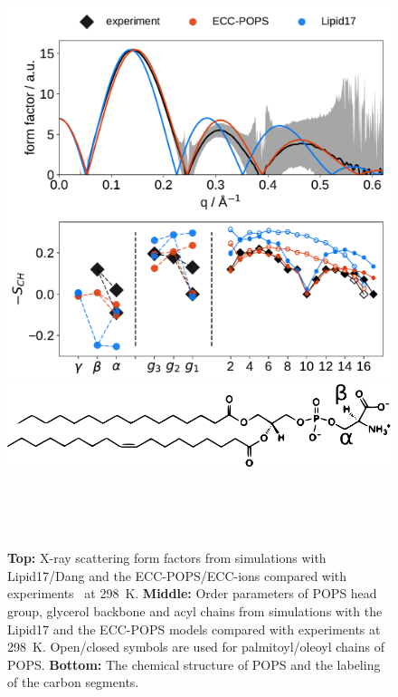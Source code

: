 \documentclass[journal=jpcbfk,manuscript=article]{achemso}
\newlength{\figwidth}
\begin{document}
\begin{figure}[tb!] 
  \centering 
  \includegraphics[width=\figwidth]{../img/ecc_pops/Order-parameters_form-factors_exp-L17-ECC-lipids.pdf}
  \includegraphics[width=\figwidth]{../img/ecc_pops/pops_chemfig.pdf} 
\hfill
  \caption{\label{simVSexpNOions_POPS} 
    \textbf{Top:} X-ray scattering form factors from simulations with Lipid17/Dang \citep{lipid17-future, dang2006} and 
    the ECC-POPS/ECC-ions \cite{martinek17, Pluhackova2016} compared with experiments~\citep{kucerka14} at 298~K. 
    \textbf{Middle:} Order parameters of POPS head group, glycerol backbone and acyl chains  
    from simulations with the Lipid17 \citep{lipid17-future} and the ECC-POPS models 
    compared with experiments at 298~K. \citep{nmrlipids_proj4}
    Open/closed symbols are used for palmitoyl/oleoyl chains of POPS. 
    \textbf{Bottom:} The chemical structure of POPS and the labeling of the carbon segments. 
  }  
   \\
   \\
   \\
\end{figure} 
\end{document}
